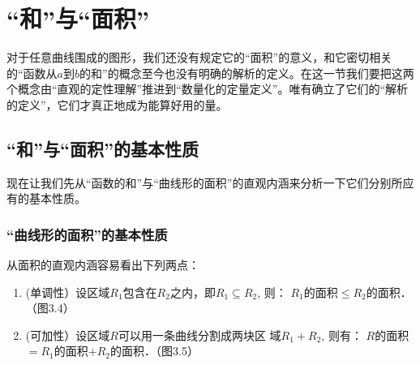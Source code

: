 \section{“和”与“面积”}
对于任意曲线围成的图形，我们还没有规定它的“面积”的意义，和它密切相关的“函数从$a$到$b$的和”的概念至今也没有明确的解析的定义。在这一节我们要把这两个概念由“直观的定性理解”推进到“数量化的定量定义”。唯有确立了它们的“解析的定义”，它们才真正地成为能算好用的量。

\subsection{“和”与“面积”的基本性质}
现在让我们先从“函数的和”与“曲线形的面积”的直观内涵来分析一下它们分别所应有的基本性质。

\subsubsection{“曲线形的面积”的基本性质}

从面积的直观内涵容易看出下列两点：
\begin{enumerate}
\item (单调性）设区域$R_1$包含在$R_2$之内，即$R_1\subseteq R_2$, 则：
$R_1$的面积$\le R_2$的面积．（图3.4）
\item (可加性）设区域$R$可以用一条曲线分割成两块区
域$R_1+R_2$, 则有：
$R$的面积$=R_1$的面积$+R_2$的面积．（图3.5）
\end{enumerate}

\begin{figure}[htp]
    \centering
    \begin{minipage}[t]{0.48\textwidth}
    \centering
    \caption{}
    \end{minipage}
    \begin{minipage}[t]{0.48\textwidth}
    \centering
    \caption{}
    \end{minipage}
\end{figure}


